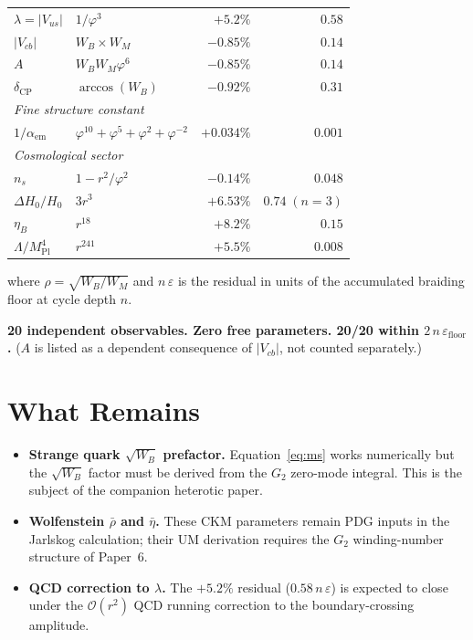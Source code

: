 \documentclass[12pt]{article}
\begin{document}
\begin{center}
\begin{tabular}{llrr}
$\lambda = |V_{us}|$    & $1/\varphi^3$               & $+5.2\%$  & $0.58$ \\
$|V_{cb}|$              & $W_B \times W_M$            & $-0.85\%$ & $0.14$ \\
$A$                     & $W_B W_M \varphi^6$         & $-0.85\%$ & $0.14$ \\
$\delta_{\text{CP}}$    & $\arccos(W_B)$              & $-0.92\%$ & $0.31$ \\
\midrule
\multicolumn{4}{l}{\textit{Fine structure constant}} \\
$1/\alpha_{\text{em}}$  & $\varphi^{10}+\varphi^5+\varphi^2+\varphi^{-2}$ & $+0.034\%$ & $0.001$ \\
\midrule
\multicolumn{4}{l}{\textit{Cosmological sector}} \\
$n_s$                   & $1-r^2/\varphi^2$           & $-0.14\%$ & $0.048$ \\
$\Delta H_0/H_0$        & $3r^3$                      & $+6.53\%$ & $0.74\;(n{=}3)$ \\
$\eta_B$                & $r^{18}$                    & $+8.2\%$  & $0.15$ \\
$\Lambda/M_{\text{Pl}}^4$ & $r^{241}$               & $+5.5\%$  & $0.008$ \\
\bottomrule
\end{tabular}
\end{center}

where $\rho = \sqrt{W_B/W_M}$ and $n\,\varepsilon$ is the residual
in units of the accumulated braiding floor at cycle depth $n$.

\textbf{20 independent observables. Zero free parameters. 20/20 within
$2\,n\,\varepsilon_{\text{floor}}$.}
($A$ is listed as a dependent consequence of $|V_{cb}|$, not counted separately.)

\section{What Remains}

\begin{itemize}
  \item \textbf{Strange quark $\sqrt{W_B}$ prefactor.}
        Equation~\eqref{eq:ms} works numerically but the $\sqrt{W_B}$
        factor must be derived from the $G_2$ zero-mode integral.
        This is the subject of the companion heterotic paper.
  \item \textbf{Wolfenstein $\bar\rho$ and $\bar\eta$.}
        These CKM parameters remain PDG inputs in the Jarlskog
        calculation; their UM derivation requires the $G_2$
        winding-number structure of Paper~6.
  \item \textbf{QCD correction to $\lambda$.}
        The $+5.2\%$ residual ($0.58\,n\,\varepsilon$) is expected
        to close under the $\mathcal{O}(r^2)$ QCD running correction
        to the boundary-crossing amplitude.
\end{itemize}
\end{document}
